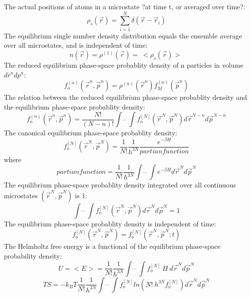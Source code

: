 \documentclass[12pt]{article}
\begin{document}
The actual positions of atoms in a microstate  \color{red}?at time t, or averaged over time?:\color{black}
\begin{equation}\rho_{s}(\vec r)=\sum_{i=1}^N\delta(\vec r - \vec r_i)\end{equation}
The equilibrium single number density distribution equals the ensemble average over all microstates, and is independent of time:
\begin{equation}n(\vec r)=\rho^{(1)}(\vec r)=~<\rho_s(\vec r)>~\end{equation}
The reduced equilibrium phase-space probablity density of n particles in volume $dr^ndp^n$:
\begin{equation}f_o^{(n)}(\vec r^n, \vec p^n)=\rho^{(n)}(\vec r^n)f_M^{(n)}(\vec p^n)\end{equation}
The relation between the  reduced equilibrium phase-space probablity density and the equilibrium phase-space probablity density:
\begin{equation}f_o^{(n)}(\vec r^n, \vec p^n)=\frac{N!}{(N-n)!}\int\dot~\dot~\dot~\int f_o^{[N]}(\vec r^N, \vec p^N) d\vec r^{N-n} d\vec p^{N-n}\end{equation}
The canonical equilibrium phase-space probablity density:
\begin{equation}f_o^{[N]}(\vec r^N, \vec p^N)=\frac{1}{N!}\frac{1}{h^{3N}}\frac{e^{-\beta H}}{partian function}\end{equation}
where
\begin{equation}{partian function}=\frac{1}{N!}\frac{1}{h^{3N}}\int\dot~\dot~\dot~\int e^{-\beta H} d\vec r^{N} d\vec p^{N}\end{equation}
The equilibrium phase-space probablity density integrated over all continuous microstates $(\vec r^N,\vec p^N)$ is 1:
\begin{equation}\int\dot~\dot~\dot~\int f_o^{[N]}(\vec r^N, \vec p^N) d\vec r^{N} d\vec p^{N}=1\end{equation}
The equilibrium phase-space probablity density is independent of time:
\begin{equation}f_o^{[N]}(\vec r^N, \vec p^N) = f_o^{[N]}(\vec r^N, \vec p^N; t)\end{equation}
The Helmholtz free energy is a functional of the equilibrium phase-space probability density:
\begin{equation}U = <E> = \frac{1}{N!}\frac{1}{h^{3N}}\int\dot~\dot~\dot~\int f_o^{[N]}~H~d\vec r^{N} d\vec p^{N}\end{equation}
\begin{equation}TS = -k_BT\frac{1}{N!}\frac{1}{h^{3N}}\int\dot~\dot~\dot~\int f_o^{[N]}ln\left(N!~h^{3N}f_o^{[N]}\right) d\vec r^{N} d\vec p^{N} \end{equation}
\end{document}
